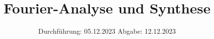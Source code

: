 

\subject{v351}
\title{Fourier-Analyse und Synthese}
\date{%
  Durchführung: 05.12.2023
  \hspace{3em}
  Abgabe: 12.12.2023
}



\maketitle
\thispagestyle{empty}
\tableofcontents
\newpage






\printbibliography{}


